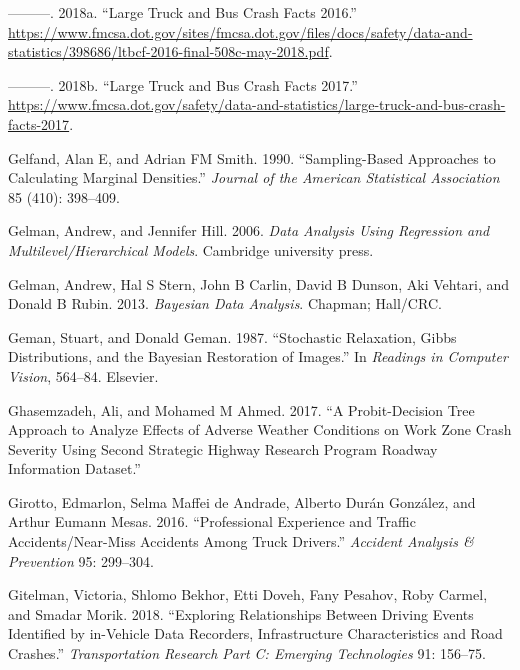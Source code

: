 \documentclass[12pt]{book}
\numberwithin{equation}{chapter}
\begin{document}
\leavevmode\hypertarget{ref-fmcsareport2016}{}%
---------. 2018a. ``Large Truck and Bus Crash Facts 2016.'' \url{https://www.fmcsa.dot.gov/sites/fmcsa.dot.gov/files/docs/safety/data-and-statistics/398686/ltbcf-2016-final-508c-may-2018.pdf}.

\leavevmode\hypertarget{ref-fmcsareport2017}{}%
---------. 2018b. ``Large Truck and Bus Crash Facts 2017.'' \url{https://www.fmcsa.dot.gov/safety/data-and-statistics/large-truck-and-bus-crash-facts-2017}.

\leavevmode\hypertarget{ref-gelfand1990sampling}{}%
Gelfand, Alan E, and Adrian FM Smith. 1990. ``Sampling-Based Approaches to Calculating Marginal Densities.'' \emph{Journal of the American Statistical Association} 85 (410): 398--409.

\leavevmode\hypertarget{ref-gelman2006data}{}%
Gelman, Andrew, and Jennifer Hill. 2006. \emph{Data Analysis Using Regression and Multilevel/Hierarchical Models}. Cambridge university press.

\leavevmode\hypertarget{ref-gelman2013bayesian}{}%
Gelman, Andrew, Hal S Stern, John B Carlin, David B Dunson, Aki Vehtari, and Donald B Rubin. 2013. \emph{Bayesian Data Analysis}. Chapman; Hall/CRC.

\leavevmode\hypertarget{ref-geman1987stochastic}{}%
Geman, Stuart, and Donald Geman. 1987. ``Stochastic Relaxation, Gibbs Distributions, and the Bayesian Restoration of Images.'' In \emph{Readings in Computer Vision}, 564--84. Elsevier.

\leavevmode\hypertarget{ref-ghasemzadeh2017probit}{}%
Ghasemzadeh, Ali, and Mohamed M Ahmed. 2017. ``A Probit-Decision Tree Approach to Analyze Effects of Adverse Weather Conditions on Work Zone Crash Severity Using Second Strategic Highway Research Program Roadway Information Dataset.''

\leavevmode\hypertarget{ref-girotto2016professional}{}%
Girotto, Edmarlon, Selma Maffei de Andrade, Alberto Durán González, and Arthur Eumann Mesas. 2016. ``Professional Experience and Traffic Accidents/Near-Miss Accidents Among Truck Drivers.'' \emph{Accident Analysis \& Prevention} 95: 299--304.

\leavevmode\hypertarget{ref-gitelman2018exploring}{}%
Gitelman, Victoria, Shlomo Bekhor, Etti Doveh, Fany Pesahov, Roby Carmel, and Smadar Morik. 2018. ``Exploring Relationships Between Driving Events Identified by in-Vehicle Data Recorders, Infrastructure Characteristics and Road Crashes.'' \emph{Transportation Research Part C: Emerging Technologies} 91: 156--75.
\end{document}
